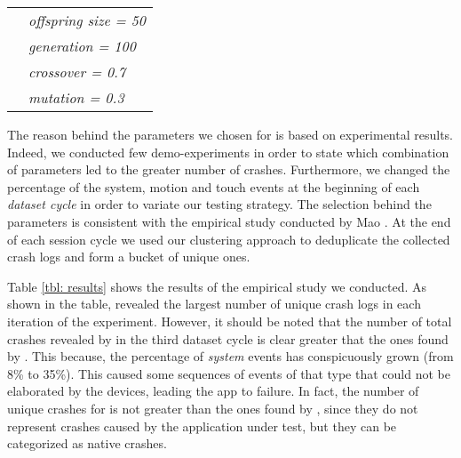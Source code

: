 \begin{table}[tb]
\begin{tabular}{l|l|}
                                                                              & \textit{offspring size = 50}                                                     \\ \cline{2-2} 
                                                                              & \textit{generation = 100}                                               \\ \cline{2-2} 
                                                                              & \textit{crossover = 0.7}                                                \\ \cline{2-2} 
                                                                              & \textit{mutation = 0.3}                                                 \\ \cline{2-2} 
\end{tabular}
\end{table}
	
The reason behind the parameters we chosen for \monkey is based on experimental results. Indeed, we conducted few demo-experiments in order to state which combination of parameters led to the greater number of crashes. 
Furthermore, we changed the percentage of the system, motion and touch events at the beginning of each \textit{dataset cycle} in order to variate our testing strategy. 
The selection behind the \sapienz parameters is consistent with the empirical study conducted by Mao \etal \cite{sapienz}.  
At the end of each {session cycle} we used our clustering approach to deduplicate the collected crash logs and form a bucket of unique ones. 


Table \ref{tbl: results} shows the results of the empirical study we conducted. 
As shown in the table, \sapienz revealed the largest number of unique crash logs in each iteration of the experiment. 
However, it should be noted that the number of total crashes revealed by \monkey in the third dataset cycle is clear greater that the ones found by \sapienz. 
This because, the percentage of \textit{system} events has conspicuously grown (from 8\% to 35\%). This caused some sequences of events of that type that could not be elaborated by the devices, leading the app to failure. 
In fact, the number of unique crashes for \monkey is not greater than the ones found by \sapienz, since they do not represent crashes caused by the application under test, but they can be categorized as native crashes. 

